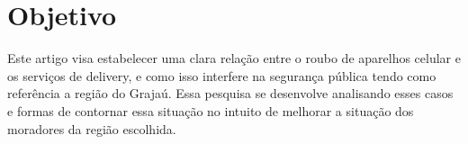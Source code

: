 \section{Objetivo}

    Este artigo visa estabelecer uma clara relação entre o roubo de aparelhos 
    celular e os serviços de delivery, e como isso interfere na segurança pública
    tendo como referência a região do Grajaú. Essa pesquisa se desenvolve analisando
    esses casos e formas de contornar  essa situação no intuito de melhorar a 
    situação dos moradores da região  escolhida.